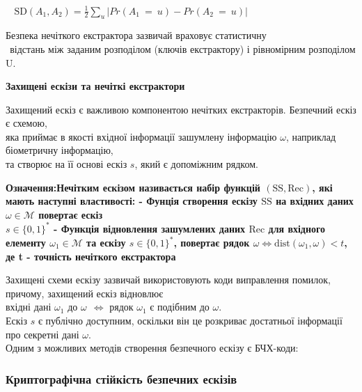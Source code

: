 \documentclass[11pt]{article}
\begin{document}
\(~~~~\text{SD}(A_1,A_2) = \frac{1}{2}\sum\limits_{u}|Pr(A_1~=~u)-Pr(A_2~=~u)|\)

Безпека нечіткого екстрактора зазвичай враховує статистичну\\
\(~~\)відстань між заданим розподілом (ключів екстрактору) і рівномірним
розподілом U.

\vspace{3ex}

    \hypertarget{ux437ux430ux445ux438ux449ux435ux43dux456-ux435ux441ux43aux456ux437ux438-ux442ux430-ux43dux435ux447ux456ux442ux43aux456-ux435ux43aux441ux442ux440ux430ux43aux442ux43eux440ux438}{%
\textbf{Захищені ескізи та нечіткі
екстрактори}\label{ux437ux430ux445ux438ux449ux435ux43dux456-ux435ux441ux43aux456ux437ux438-ux442ux430-ux43dux435ux447ux456ux442ux43aux456-ux435ux43aux441ux442ux440ux430ux43aux442ux43eux440ux438}}

Захищений ескіз є важливою компонентою нечітких екстракторів. Безпечний
ескіз є схемою,\\
яка приймає в якості вхідної інформації зашумлену інформацію \(\omega\),
наприклад біометричну інформацію,\\
та створює на її основі ескіз \(s\), який є допоміжним рядком.

\bf{Означення:}\normalfont \space Нечітким ескізом називається набір функцій
\((\text{SS},\text{Rec})\), які мають наступні властивості: - Фунція
створення ескізу \(\text{SS}\) на вхідних даних
\(\omega \in \mathcal{M}\) повертає ескіз\\
\(s \in \{0,1\}^*\) - Функція відновлення зашумлених даних
\(\text{Rec}\) для вхідного елементу \(\omega_1 \in \mathcal{M}\) та
ескізу \(s \in \{0,1\}^*\), повертає рядок
\(\omega \Longleftrightarrow \text{dist}(\omega_1,\omega)<t\), де t -
точність нечіткого екстрактора

Захищені схеми ескізу зазвичай використовують коди виправлення помилок,
причому, захищений ескіз відновлює\\
вхідні дані \(\omega_1\) до \(\omega ~~ \Longleftrightarrow\) рядок
\(\omega_1\) є подібним до \(\omega\).\\
Ескіз \(s\) є публічно доступним, оскільки він це розкриває достатньої
інформації про секретні дані \(\omega\).\\
Одним з можливих методів створення безпечного ескізу є БЧХ-коди:
\vspace{20ex}
    \hypertarget{ux43aux440ux438ux43fux442ux43eux433ux440ux430ux444ux456ux447ux43dux430-ux441ux442ux456ux439ux43aux456ux441ux442ux44c-ux431ux435ux437ux43fux435ux447ux43dux438ux445-ux435ux441ux43aux456ux437ux456ux432}{%
\subsubsection{Криптографічна стійкість безпечних
ескізів}\label{ux43aux440ux438ux43fux442ux43eux433ux440ux430ux444ux456ux447ux43dux430-ux441ux442ux456ux439ux43aux456ux441ux442ux44c-ux431ux435ux437ux43fux435ux447ux43dux438ux445-ux435ux441ux43aux456ux437ux456ux432}}
\end{document}
